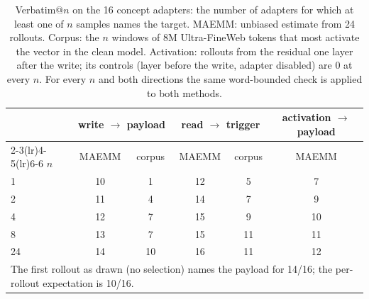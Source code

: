 \begin{table}[htbp]
\centering
\small
\begin{tabular}{l cc cc c}
\toprule
& \multicolumn{2}{c}{write $\to$ payload} & \multicolumn{2}{c}{read $\to$ trigger} & activation $\to$ payload \\
\cmidrule(lr){2-3}\cmidrule(lr){4-5}\cmidrule(lr){6-6}
$n$ & MAEMM & corpus & MAEMM & corpus & MAEMM \\
\midrule
1  & 10 & 1 & 12 & 5 & 7 \\
2  & 11 & 4 & 14 & 7 & 9 \\
4  & 12 & 7 & 15 & 9 & 10 \\
8  & 13 & 7 & 15 & 11 & 11 \\
24 & 14 & 10 & 16 & 11 & 12 \\
\midrule
\multicolumn{6}{l}{\footnotesize The first rollout as drawn (no selection) names the payload for 14/16; the per-rollout expectation is 10/16.} \\
\bottomrule
\end{tabular}
\caption{Verbatim@$n$ on the 16 concept adapters: the number of adapters for which at least one
of $n$ samples names the target. MAEMM: unbiased estimate from 24 rollouts. Corpus: the $n$
windows of 8M Ultra-FineWeb tokens that most activate the vector in the clean model. Activation:
rollouts from the residual one layer after the write; its controls (layer before the write,
adapter disabled) are 0 at every $n$. For every $n$ and both directions the same word-bounded
check is applied to both methods.}
\label{tab:verbatim-at-n}
\end{table}


